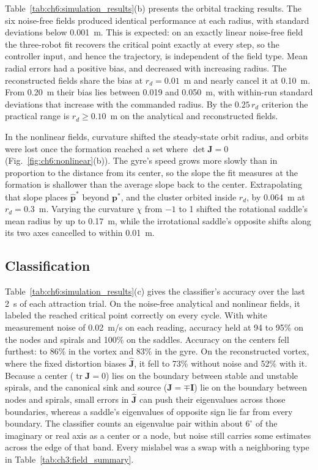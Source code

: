     Table~\ref{tab:ch6:simulation_results}(b) presents the orbital tracking results. The six noise-free fields produced identical performance at each radius, with standard deviations below 0.001~m. This is expected: on an exactly linear noise-free field the three-robot fit recovers the critical point exactly at every step, so the controller input, and hence the trajectory, is independent of the field type. Mean radial errors had a positive bias, and decreased with increasing radius. The reconstructed fields share the bias at $r_d = 0.01$~m and nearly cancel it at 0.10~m. From 0.20~m their bias lies between 0.019 and 0.050~m, with within-run standard deviations that increase with the commanded radius. By the $0.25\,r_d$ criterion the practical range is $r_d \ge 0.10$~m on the analytical and reconstructed fields.

In the nonlinear fields, curvature shifted the steady-state orbit radius, and orbits were lost once the formation reached a set where $\det\mathbf{J} = 0$ (Fig.~\ref{fig:ch6:nonlinear}(b)). The gyre's speed grows more slowly than in proportion to the distance from its center, so the slope the fit measures at the formation is shallower than the average slope back to the center. Extrapolating that slope places $\hat{\mathbf{p}}^*$ beyond $\mathbf{p}^*$, and the cluster orbited inside $r_d$, by 0.064~m at $r_d = 0.3$~m. Varying the curvature $\chi$ from $-1$ to 1 shifted the rotational saddle's mean radius by up to 0.17~m, while the irrotational saddle's opposite shifts along its two axes cancelled to within 0.01~m.

\subsection{Classification}
\label{sec:ch6:sim_class}

Table~\ref{tab:ch6:simulation_results}(c) gives the classifier's accuracy over the last 2~s of each attraction trial. On the noise-free analytical and nonlinear fields, it labeled the reached critical point correctly on every cycle. With white measurement noise of 0.02~m/s on each reading, accuracy held at 94 to 95\% on the nodes and spirals and 100\% on the saddles. Accuracy on the centers fell furthest: to 86\% in the vortex and 83\% in the gyre. On the reconstructed vortex, where the fixed distortion biases $\hat{\mathbf{J}}$, it fell to 73\% without noise and 52\% with it. Because a center ($\operatorname{tr}\mathbf{J} = 0$) lies on the boundary between stable and unstable spirals, and the canonical sink and source ($\mathbf{J} = \mp\mathbf{I}$) lie on the boundary between nodes and spirals, small errors in $\hat{\mathbf{J}}$ can push their eigenvalues across those boundaries, whereas a saddle's eigenvalues of opposite sign lie far from every boundary. The classifier counts an eigenvalue pair within about $6^\circ$ of the imaginary or real axis as a center or a node, but noise still carries some estimates across the edge of that band. Every mislabel was a swap with a neighboring type in Table~\ref{tab:ch3:field_summary}.

